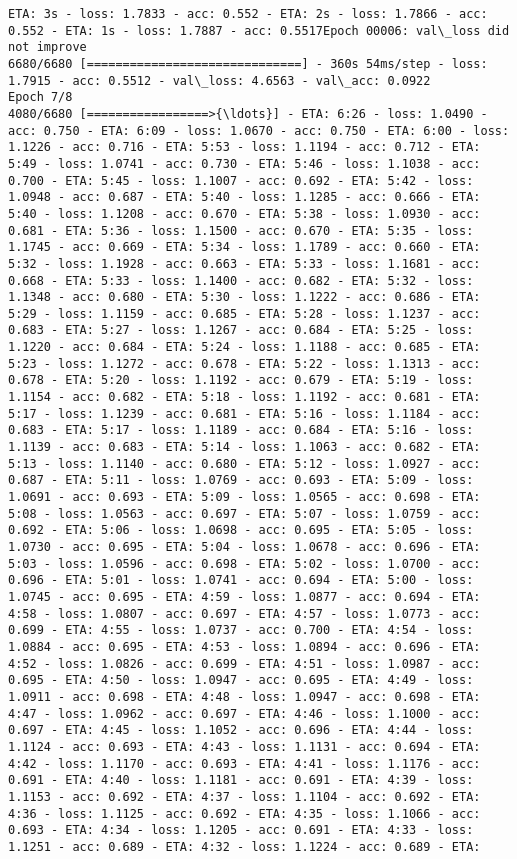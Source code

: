 \documentclass[11pt]{article}
\begin{document}
\begin{Verbatim}[commandchars=\\\{\}]
ETA: 3s - loss: 1.7833 - acc: 0.552 - ETA: 2s - loss: 1.7866 - acc: 0.552 - ETA: 1s - loss: 1.7887 - acc: 0.5517Epoch 00006: val\_loss did not improve
6680/6680 [==============================] - 360s 54ms/step - loss: 1.7915 - acc: 0.5512 - val\_loss: 4.6563 - val\_acc: 0.0922
Epoch 7/8
4080/6680 [=================>{\ldots}] - ETA: 6:26 - loss: 1.0490 - acc: 0.750 - ETA: 6:09 - loss: 1.0670 - acc: 0.750 - ETA: 6:00 - loss: 1.1226 - acc: 0.716 - ETA: 5:53 - loss: 1.1194 - acc: 0.712 - ETA: 5:49 - loss: 1.0741 - acc: 0.730 - ETA: 5:46 - loss: 1.1038 - acc: 0.700 - ETA: 5:45 - loss: 1.1007 - acc: 0.692 - ETA: 5:42 - loss: 1.0948 - acc: 0.687 - ETA: 5:40 - loss: 1.1285 - acc: 0.666 - ETA: 5:40 - loss: 1.1208 - acc: 0.670 - ETA: 5:38 - loss: 1.0930 - acc: 0.681 - ETA: 5:36 - loss: 1.1500 - acc: 0.670 - ETA: 5:35 - loss: 1.1745 - acc: 0.669 - ETA: 5:34 - loss: 1.1789 - acc: 0.660 - ETA: 5:32 - loss: 1.1928 - acc: 0.663 - ETA: 5:33 - loss: 1.1681 - acc: 0.668 - ETA: 5:33 - loss: 1.1400 - acc: 0.682 - ETA: 5:32 - loss: 1.1348 - acc: 0.680 - ETA: 5:30 - loss: 1.1222 - acc: 0.686 - ETA: 5:29 - loss: 1.1159 - acc: 0.685 - ETA: 5:28 - loss: 1.1237 - acc: 0.683 - ETA: 5:27 - loss: 1.1267 - acc: 0.684 - ETA: 5:25 - loss: 1.1220 - acc: 0.684 - ETA: 5:24 - loss: 1.1188 - acc: 0.685 - ETA: 5:23 - loss: 1.1272 - acc: 0.678 - ETA: 5:22 - loss: 1.1313 - acc: 0.678 - ETA: 5:20 - loss: 1.1192 - acc: 0.679 - ETA: 5:19 - loss: 1.1154 - acc: 0.682 - ETA: 5:18 - loss: 1.1192 - acc: 0.681 - ETA: 5:17 - loss: 1.1239 - acc: 0.681 - ETA: 5:16 - loss: 1.1184 - acc: 0.683 - ETA: 5:17 - loss: 1.1189 - acc: 0.684 - ETA: 5:16 - loss: 1.1139 - acc: 0.683 - ETA: 5:14 - loss: 1.1063 - acc: 0.682 - ETA: 5:13 - loss: 1.1140 - acc: 0.680 - ETA: 5:12 - loss: 1.0927 - acc: 0.687 - ETA: 5:11 - loss: 1.0769 - acc: 0.693 - ETA: 5:09 - loss: 1.0691 - acc: 0.693 - ETA: 5:09 - loss: 1.0565 - acc: 0.698 - ETA: 5:08 - loss: 1.0563 - acc: 0.697 - ETA: 5:07 - loss: 1.0759 - acc: 0.692 - ETA: 5:06 - loss: 1.0698 - acc: 0.695 - ETA: 5:05 - loss: 1.0730 - acc: 0.695 - ETA: 5:04 - loss: 1.0678 - acc: 0.696 - ETA: 5:03 - loss: 1.0596 - acc: 0.698 - ETA: 5:02 - loss: 1.0700 - acc: 0.696 - ETA: 5:01 - loss: 1.0741 - acc: 0.694 - ETA: 5:00 - loss: 1.0745 - acc: 0.695 - ETA: 4:59 - loss: 1.0877 - acc: 0.694 - ETA: 4:58 - loss: 1.0807 - acc: 0.697 - ETA: 4:57 - loss: 1.0773 - acc: 0.699 - ETA: 4:55 - loss: 1.0737 - acc: 0.700 - ETA: 4:54 - loss: 1.0884 - acc: 0.695 - ETA: 4:53 - loss: 1.0894 - acc: 0.696 - ETA: 4:52 - loss: 1.0826 - acc: 0.699 - ETA: 4:51 - loss: 1.0987 - acc: 0.695 - ETA: 4:50 - loss: 1.0947 - acc: 0.695 - ETA: 4:49 - loss: 1.0911 - acc: 0.698 - ETA: 4:48 - loss: 1.0947 - acc: 0.698 - ETA: 4:47 - loss: 1.0962 - acc: 0.697 - ETA: 4:46 - loss: 1.1000 - acc: 0.697 - ETA: 4:45 - loss: 1.1052 - acc: 0.696 - ETA: 4:44 - loss: 1.1124 - acc: 0.693 - ETA: 4:43 - loss: 1.1131 - acc: 0.694 - ETA: 4:42 - loss: 1.1170 - acc: 0.693 - ETA: 4:41 - loss: 1.1176 - acc: 0.691 - ETA: 4:40 - loss: 1.1181 - acc: 0.691 - ETA: 4:39 - loss: 1.1153 - acc: 0.692 - ETA: 4:37 - loss: 1.1104 - acc: 0.692 - ETA: 4:36 - loss: 1.1125 - acc: 0.692 - ETA: 4:35 - loss: 1.1066 - acc: 0.693 - ETA: 4:34 - loss: 1.1205 - acc: 0.691 - ETA: 4:33 - loss: 1.1251 - acc: 0.689 - ETA: 4:32 - loss: 1.1224 - acc: 0.689 - ETA: 
\end{Verbatim}
\end{document}
